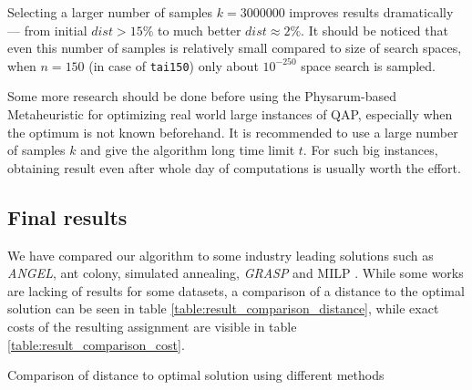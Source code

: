 Selecting a larger number of samples $k=3000000$ improves results dramatically --- from initial $dist>15\%$ to much better $dist{\approx}2\%$. It should be noticed that even this number of samples is relatively small compared to size of search spaces, when $n=150$ (in case of \texttt{tai150}) only about $10^{-250}$ space search is sampled.

Some more research should be done before using the Physarum-based Metaheuristic for optimizing real world large instances of QAP, especially when the optimum is not known beforehand. It is recommended to use a large number of samples $k$ and give the algorithm long time limit $t$. For such big instances, obtaining result even after whole day of computations is usually worth the effort.

\subsection{Final results}

We have compared our algorithm to some industry leading solutions such as \textit{ANGEL}, ant colony, simulated annealing, \textit{GRASP} and MILP \cite{TODO}. While some works are lacking of results for some datasets, a comparison of a distance to the optimal solution can be seen in table \ref{table:result_comparison_distance}, while exact costs of the resulting assignment are visible in table \ref{table:result_comparison_cost}. 

\begin{table}
  \centering
  \caption{Comparison of distance to optimal solution using different methods}
  \label{table:result_comparison_distance}

\end{table}

